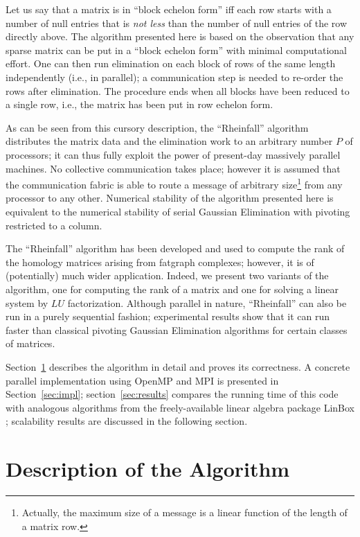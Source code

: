 Let us say that a matrix is in ``block echelon form'' iff each row
starts with a number of null entries that is \emph{not less} than the
number of null entries of the row directly above.
The algorithm presented here is based on the observation that any
sparse matrix can be put in a ``block echelon form'' with minimal
computational effort.  One can then run elimination on each block of
rows of the same length independently (i.e., in parallel); a
communication step is needed to re-order the rows after elimination. 
The procedure ends when all blocks have been reduced to a single row,
i.e., the matrix has been put in row echelon form.

As can be seen from this cursory description, the ``Rheinfall'' algorithm
distributes the matrix data and the elimination work to an arbitrary
number $P$ of processors; it can thus fully exploit the power of
present-day massively parallel
machines.  No collective communication takes place; however it is
assumed that the communication fabric is able to route a message of
arbitrary size\footnote{Actually, the maximum size of a message is a
  linear function of the length of a matrix row.} from any processor
to any other.  Numerical stability of the algorithm presented here is
equivalent to the numerical stability of serial Gaussian Elimination
with pivoting restricted to a column.

The ``Rheinfall'' algorithm has been developed and used to compute the
rank of the homology matrices arising from fatgraph complexes;
however, it is of (potentially) much wider application.  Indeed, we
present two variants of the algorithm, one for computing the rank of a
matrix and one for solving a linear system by $LU$ factorization.
Although parallel in nature, ``Rheinfall'' can also be run in a purely
sequential fashion; experimental results show that it can run faster
than classical pivoting Gaussian Elimination algorithms for certain
classes of matrices.

Section~\ref{sec:algo} describes the algorithm in detail and proves
its correctness.  A concrete parallel implementation using
OpenMP and MPI is presented in Section~\ref{sec:impl};
section~\ref{sec:results} compares the running time of this code with
analogous algorithms from the freely-available linear algebra package
LinBox \cite{linbox, linbox:website}; scalability results are discussed in the
following section.


\section{Description of the Algorithm}
\label{sec:algo}

